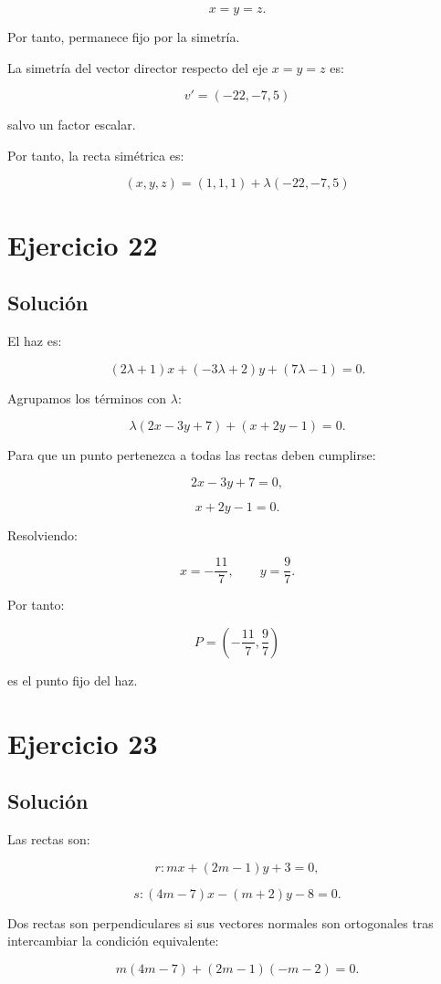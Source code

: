 \documentclass[11pt,a4paper]{article}
\begin{document}
\[
x=y=z.
\]

Por tanto, permanece fijo por la simetría.

La simetría del vector director respecto del eje \(x=y=z\) es:

\[
v'
=
(-22,-7,5)
\]

salvo un factor escalar.

Por tanto, la recta simétrica es:

\[
\boxed{
(x,y,z)
=
(1,1,1)
+
\lambda(-22,-7,5)
}
\]

\section{Ejercicio 22}
\subsection{Solución}

El haz es:

\[
(2\lambda+1)x
+
(-3\lambda+2)y
+
(7\lambda-1)
=
0.
\]

Agrupamos los términos con \(\lambda\):

\[
\lambda(2x-3y+7)
+
(x+2y-1)
=
0.
\]

Para que un punto pertenezca a todas las rectas deben cumplirse:

\[
2x-3y+7=0,
\]

\[
x+2y-1=0.
\]

Resolviendo:

\[
x=-\frac{11}{7},
\qquad
y=\frac97.
\]

Por tanto:

\[
\boxed{
P=
\left(
-\frac{11}{7},
\frac97
\right)
}
\]

es el punto fijo del haz.

\section{Ejercicio 23}
\subsection{Solución}

Las rectas son:

\[
r:
mx+(2m-1)y+3=0,
\]

\[
s:
(4m-7)x-(m+2)y-8=0.
\]

Dos rectas son perpendiculares si sus vectores normales son ortogonales tras intercambiar la condición equivalente:

\[
m(4m-7)
+
(2m-1)(-m-2)
=
0.
\]
\end{document}
